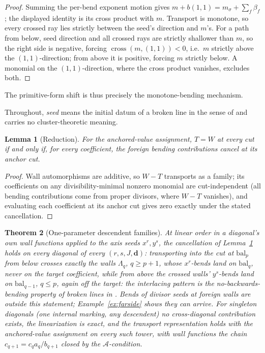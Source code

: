 \documentclass[11pt]{amsart}
\newtheorem{theorem}{Theorem}[section]
\newtheorem{lemma}[theorem]{Lemma}
\theoremstyle{definition}
\theoremstyle{remark}
\newcommand{\Ascr}{\mathcal{A}}
\begin{document}
\begin{proof}
Summing the per-bend exponent motion gives
$m+b(1,1)=m_{\sigma}+\sum_{f}\beta_{f}$; the displayed identity is its cross
product with $m$. Transport is monotone, so every crossed ray lies strictly
between the seed's direction and $m$'s. For a path from below, seed direction
and all crossed rays are strictly shallower than $m$, so the right side is
negative, forcing $\operatorname{cross}(m,(1,1))<0$, i.e.\ $m$ strictly above
the $(1,1)$-direction; from above it is positive, forcing $m$ strictly below. A monomial on the
$(1,1)$-direction, where the cross product vanishes, excludes both.
\end{proof}

The primitive-form shift is thus precisely the monotone-bending mechanism.

Throughout, \emph{seed} means the initial datum of a broken line in the sense of
\cite{Gross10,CPS} and carries no cluster-theoretic meaning.

\begin{lemma}[Reduction]
\label{lem:reduction}
For the anchored-value assignment, $T=W$ at every cut if and only if, for
every coefficient, the foreign bending contributions cancel at its anchor cut.
\end{lemma}

\begin{proof}
Wall automorphisms are additive, so $W-T$ transports as a family; its
coefficients on any divisibility-minimal nonzero monomial are
cut-independent (all bending contributions come from proper divisors, where $W-T$
vanishes), and evaluating each coefficient at its anchor cut gives zero
exactly under the stated cancellation.
\end{proof}

\begin{theorem}[One-parameter descendent families]
\label{thm:linearorder}
At linear order in a diagonal's own wall functions applied to the axis seeds
$x^{r},y^{s}$, the cancellation of
Lemma~\ref{lem:reduction} holds on every diagonal of every
$(r,s,J,\mathbf d)$: transporting into the cut at $\mathrm{bal}_{p}$ from below
crosses exactly the walls $\Lambda_{q}$, $q\ge p{+}1$, whose $x^{r}$-bends land
on $\mathrm{bal}_{q}$, never on the target coefficient, while from above the
crossed walls' $y^{s}$-bends land on $\mathrm{bal}_{q-1}$, $q\le p$, again off
the target: the interlacing pattern is
the no-backwards-bending property of broken lines in \cite{CPS}. Bends of
divisor seeds at foreign walls are outside this statement; Example~\ref{ex:farside}
shows they can arrive. For singleton
diagonals (one internal marking, any descendent) no cross-diagonal contribution exists,
the linearization is exact, and the transport representation holds with the
anchored-value assignment on every such tower, with wall functions the chain
$c_{q+1}=c_{q}a_{q}/b_{q+1}$ closed by the $\Ascr$-condition.
\end{theorem}
\end{document}
